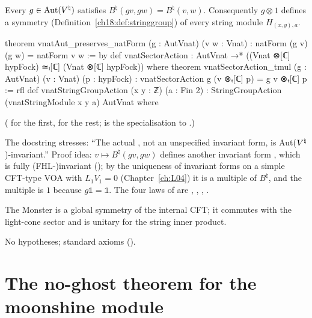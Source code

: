 \begin{theorem}\label{ch18:thm:sectoraction}
Every $g\in\operatorname{Aut}({V^{\natural}})$ satisfies $B^\natural(gv,gw)=B^\natural(v,w)$.  Consequently $g\otimes1$ defines a
symmetry (Definition~\ref{ch18:def:stringgroup}) of every string module $H_{(x,y),a}$.
\end{theorem}
\begin{leancode}
theorem vnatAut_preserves_natForm (g : AutVnat) (v w : Vnat) :
    natForm (g v) (g w) = natForm v w := by
def vnatSectorAction : AutVnat →* ((Vnat ⊗[ℂ] hypFock) ≃ₗ[ℂ] (Vnat ⊗[ℂ] hypFock)) where
theorem vnatSectorAction_tmul (g : AutVnat) (v : Vnat) (p : hypFock) :
    vnatSectorAction g (v ⊗ₜ[ℂ] p) = g v ⊗ₜ[ℂ] p := rfl
def vnatStringGroupAction (x y : ℤ) (a : Fin 2) :
    StringGroupAction (vnatStringModule x y a) AutVnat where
\end{leancode}
( for the first,
 for the rest;  is the
specialisation to .)
\begin{dictionary}
The docstring stresses: ``The actual , not an unspecified invariant form, is
Aut(${V^{\natural}}$)-invariant.''  Proof idea: $v\mapsto B^\natural(gv,gw)$ defines another invariant form
, which is fully (FHL-)invariant (); by the
uniqueness of invariant forms on a simple CFT-type VOA with $L_1V_1=0$ (Chapter~\ref{ch:L04}) it is a
multiple of $B^\natural$, and the multiple is $1$ because $g\mathbb 1=\mathbb 1$.  The four laws of
 are , ,
, .
\end{dictionary}
\begin{physics}
The Monster is a global symmetry of the internal CFT; it commutes with the light-cone sector and is
unitary for the string inner product.
\end{physics}
\begin{status}No hypotheses; standard axioms ().\end{status}

\section{The no-ghost theorem for the moonshine module}\label{ch18:sec:vnatnoghost}

